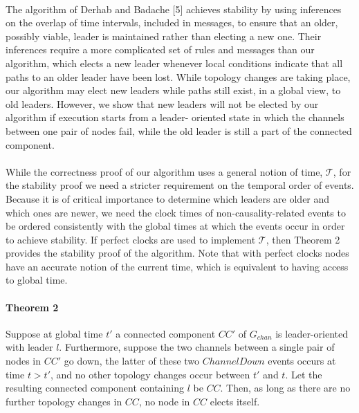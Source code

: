 \paragraph{}The algorithm of Derhab and Badache [5] achieves stability by using inferences on the overlap of time intervals, included in messages, to ensure that an older, possibly viable, leader is maintained rather than electing a new one. Their inferences require a more complicated set of rules and messages than our algorithm, which elects a new leader whenever local conditions indicate that all paths to an older leader have been lost. While topology changes are taking place, our algorithm may elect new leaders while paths still exist, in a global view, to old leaders. However, we show that new leaders will not be elected by our algorithm if execution starts from a leader- oriented state in which the channels between one pair of nodes fail, while the old leader is still a part of the connected component.
\paragraph{}While the correctness proof of our algorithm uses a general notion of time, $\mathcal{T}$, for the stability proof we need a stricter requirement on the temporal order of events. Because it is of critical importance to determine which leaders are older and which ones are newer, we need the clock times of non-causality-related events to be ordered consistently with the global times at which the events occur in order to achieve stability. If perfect clocks are used to implement $\mathcal{T}$, then Theorem 2 provides the stability proof of the algorithm. Note that with perfect clocks nodes have an accurate notion of the current time, which is equivalent to having access to global time.
\paragraph{Theorem 2}Suppose at global time $t'$ a connected component $CC'$ of $G_{chan}$ is leader-oriented with leader $l$. Furthermore, suppose the two channels between a single pair of nodes in $CC'$ go down, the latter of these two $ChannelDown$ events occurs at time $t > t '$, and no other topology changes occur between $t'$ and $t$. Let the resulting connected component containing $l$ be $CC$. Then, as long as there are no further topology changes in $CC$, no node in $CC$ elects itself.
